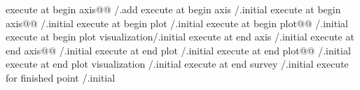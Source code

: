 execute at begin axis@@            /.add
execute at begin axis              /.initial
execute at begin axis@@            /.initial
execute at begin plot              /.initial
execute at begin plot@@            /.initial
execute at begin plot visualization/.initial
execute at end axis                /.initial
execute at end axis@@              /.initial
execute at end plot                /.initial
execute at end plot@@              /.initial
execute at end plot visualization  /.initial
execute at end survey              /.initial
execute for finished point         /.initial


